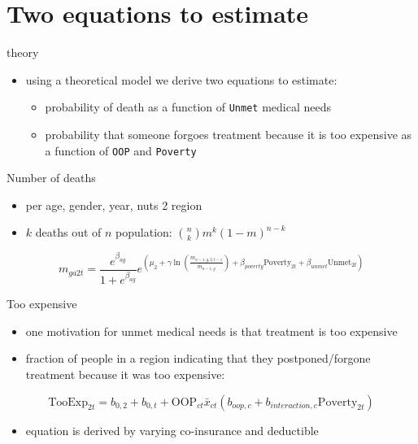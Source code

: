 \documentclass[presentation]{beamer}
\begin{document}
\section*{Two equations to estimate}
\label{sec:orgba26dfa}

\begin{frame}[label={sec:orgb44f304},fragile]{theory}
 \begin{itemize}
\item using a theoretical model we derive two equations to estimate:
\begin{itemize}
\item probability of death as a function of \texttt{Unmet} medical needs
\item probability that someone forgoes treatment because it is too expensive as a function of \texttt{OOP} and \texttt{Poverty}
\end{itemize}
\end{itemize}
\end{frame}

\begin{frame}[label={sec:orgc03c79b}]{Number of deaths}
\begin{itemize}
\item per age, gender, year, nuts 2 region
\item \(k\) deaths out of \(n\) population: \(\binom{n}{k} m^{k}(1-m)^{n-k}\)
\end{itemize}
$$
m_{ga2t} = \frac{e^{\beta_{ag}}}{1+e^{\beta_{ag}}} e^{\left( \mu_2 + \gamma \ln \left(\frac{m_{a-1,g,2,t-1}}{\bar{m}_{a-1,g}}\right)+ \beta_{poverty}\text{Poverty}_{2t} + \beta_{unmet}\text{Unmet}_{2t}\right)}
$$
\end{frame}

\begin{frame}[label={sec:org964dcb9}]{Too expensive}
\begin{itemize}
\item one motivation for unmet medical needs is that treatment is too expensive
\item fraction of people in a region indicating that they postponed/forgone treatment because it was too expensive:
\end{itemize}
$$
\text{TooExp}_{2t} = b_{0,2} + b_{0,t} + \text{OOP}_{ct} \bar{x}_{ct} \left(  b_{oop,c} + b_{interaction,c} \text{Poverty}_{2t} \right)
$$
\begin{itemize}
\item equation is derived by varying co-insurance and deductible
\end{itemize}
\end{frame}
\end{document}

